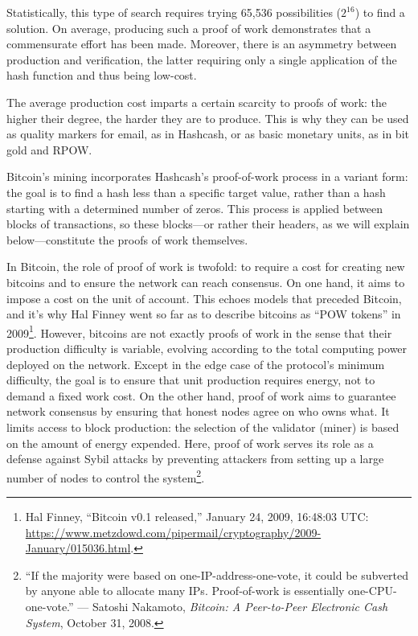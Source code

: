 \documentclass[
  a5paper,
  smalldemyvopaper,10pt,twoside,onecolumn,openright,extrafontsizes,hidelinks]{memoir}
\begin{document}
Statistically, this type of search requires trying 65,536 possibilities
(\(2^{16}\)) to find a solution. On average, producing such a proof of
work demonstrates that a commensurate effort has been made. Moreover,
there is an asymmetry between production and verification, the latter
requiring only a single application of the hash function and thus being
low-cost.

The average production cost imparts a certain scarcity to proofs of
work: the higher their degree, the harder they are to produce. This is
why they can be used as quality markers for email, as in Hashcash, or as
basic monetary units, as in bit gold and RPOW.

Bitcoin's mining incorporates Hashcash's proof-of-work process in a
variant form: the goal is to find a hash less than a specific target
value, rather than a hash starting with a determined number of zeros.
This process is applied between blocks of transactions, so these
blocks---or rather their headers, as we will explain below---constitute
the proofs of work themselves.

In Bitcoin, the role of proof of work is twofold: to require a cost for
creating new bitcoins and to ensure the network can reach consensus. On
one hand, it aims to impose a cost on the unit of account. This echoes
models that preceded Bitcoin, and it's why Hal Finney went so far as to
describe bitcoins as ``POW tokens'' in 2009\footnote{Hal Finney,
  ``Bitcoin v0.1 released,'' January 24, 2009, 16:48:03 UTC:
  \url{https://www.metzdowd.com/pipermail/cryptography/2009-January/015036.html}.}.
However, bitcoins are not exactly proofs of work in the sense that their
production difficulty is variable, evolving according to the total
computing power deployed on the network. Except in the edge case of the
protocol's minimum difficulty, the goal is to ensure that unit
production requires energy, not to demand a fixed work cost. On the
other hand, proof of work aims to guarantee network consensus by
ensuring that honest nodes agree on who owns what. It limits access to
block production: the selection of the validator (miner) is based on the
amount of energy expended. Here, proof of work serves its role as a
defense against Sybil attacks by preventing attackers from setting up a
large number of nodes to control the system\footnote{``If the majority
  were based on one-IP-address-one-vote, it could be subverted by anyone
  able to allocate many IPs. Proof-of-work is essentially
  one-CPU-one-vote.'' --- Satoshi Nakamoto, \emph{Bitcoin: A
  Peer-to-Peer Electronic Cash System}, October 31, 2008.}.
\end{document}
